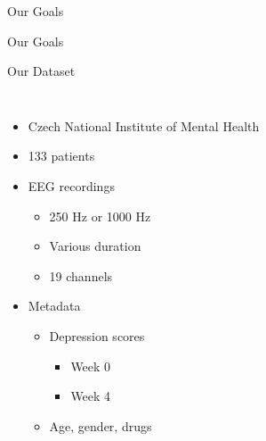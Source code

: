 \documentclass{beamer}
\begin{document}

\begin{frame}{Our Goals}
  
\end{frame}

\begin{frame}{Our Goals}
  
\end{frame}


%   


\begin{frame}{Our Dataset}
	\begin{columns}
        \begin{itemize}
            \item<1-> Czech National Institute of Mental Health
            \item<2-> 133 patients
            \item<3-> EEG recordings
              \begin{itemize}
                \item 250 Hz or 1000 Hz
                \item Various duration
                \item 19 channels
              \end{itemize}
              \item<4-> Metadata
                  \begin{itemize}
                      \item Depression scores
                          \begin{itemize}
                              \item Week 0
                              \item Week 4
                          \end{itemize}
                       \item Age, gender, drugs
                  \end{itemize}
        \end{itemize}

\end{columns}
\end{frame}
\end{document}
